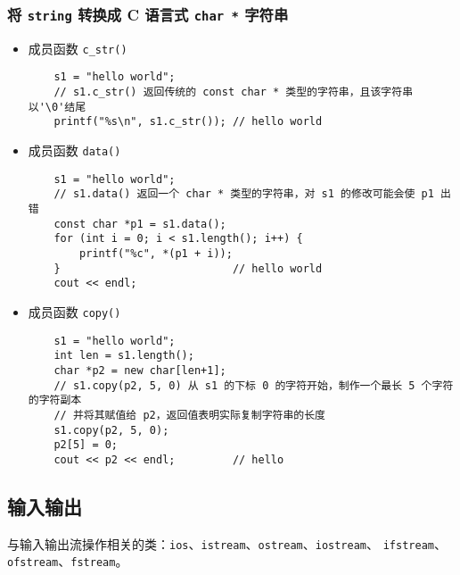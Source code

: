\documentclass[UTF8]{ctexart}
\begin{document}
\subsubsection{将 \texttt{string} 转换成 C 语言式 \texttt{char *} 字符串}
\begin{itemize}
    \item 成员函数 \texttt{c\_str()}
    \begin{verbatim}
    s1 = "hello world";
    // s1.c_str() 返回传统的 const char * 类型的字符串，且该字符串以'\0'结尾
    printf("%s\n", s1.c_str()); // hello world
    \end{verbatim}
    \item 成员函数 \texttt{data()}
    \begin{verbatim}
    s1 = "hello world";
    // s1.data() 返回一个 char * 类型的字符串，对 s1 的修改可能会使 p1 出错
    const char *p1 = s1.data();
    for (int i = 0; i < s1.length(); i++) {
        printf("%c", *(p1 + i));
    }                           // hello world
    cout << endl;
    \end{verbatim}
    \item 成员函数 \texttt{copy()}
    \begin{verbatim}
    s1 = "hello world";
    int len = s1.length();
    char *p2 = new char[len+1];
    // s1.copy(p2, 5, 0) 从 s1 的下标 0 的字符开始，制作一个最长 5 个字符的字符副本
    // 并将其赋值给 p2，返回值表明实际复制字符串的长度
    s1.copy(p2, 5, 0);
    p2[5] = 0;
    cout << p2 << endl;         // hello
    \end{verbatim}
\end{itemize}

\subsection{输入输出}
与输入输出流操作相关的类：\texttt{ios}、\texttt{istream}、\texttt{ostream}、\texttt{iostream}、
\texttt{ifstream}、\texttt{ofstream}、\texttt{fstream}。
\end{document}
